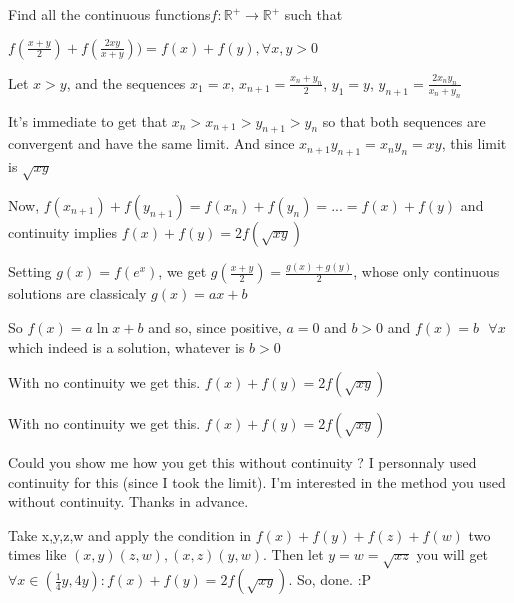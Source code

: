 \begin{solution}
	\begin{tcolorbox}Find all the continuous functions$ f:\mathbb{R}^{+}\rightarrow \mathbb{R}^{+}$ such  that

$f\left ( \frac{x+y}{2} \right )+f\left ( \frac{2xy}{x+y} \right ) )=f(x)+f(y),\forall x,y> 0$\end{tcolorbox}
Let $x>y$, and the sequences $x_1=x$, $x_{n+1}=\frac{x_n+y_n}2$, $y_1=y$, $y_{n+1}=\frac {2x_ny_n}{x_n+y_n}$

It's immediate to get that $x_n>x_{n+1}>y_{n+1}>y_n$ so that both sequences are convergent and have the same limit.
And since $x_{n+1}y_{n+1}=x_ny_n=xy$, this limit is ${\sqrt {xy}}$

Now, $f(x_{n+1})+f(y_{n+1})=f(x_n)+f(y_n)=...=f(x)+f(y)$ and continuity implies $f(x)+f(y)=2f(\sqrt{xy})$

Setting $g(x)=f(e^x)$, we get $g(\frac{x+y}2)=\frac{g(x)+g(y)}2$, whose only continuous solutions are classicaly $g(x)=ax+b$

So $f(x)=a\ln x + b$ and so, since positive, $a=0$ and $b>0$ and $\boxed{f(x)=b\text{  }\forall x}$ which indeed is a solution, whatever is $b>0$
\end{solution}



\begin{solution}
	With no continuity we get this.
$ f(x)+f(y)=2f(\sqrt{xy}) $
\end{solution}



\begin{solution}
	\begin{tcolorbox}With no continuity we get this.
$ f(x)+f(y)=2f(\sqrt{xy}) $\end{tcolorbox}
Could you show me how you get this without continuity ?
I personnaly used continuity for this (since I took the limit). I'm interested in the method you used without continuity.
Thanks in advance.
\end{solution}



\begin{solution}
	Take x,y,z,w and apply the condition in $ f(x)+f(y)+f(z)+f(w) $ two times like $ (x,y)(z,w) ,(x,z)(y,w) $. Then let $ y=w=\sqrt{xz} $ you will get 
$ \forall x\in (\frac{1}{4}y,4y): f(x)+f(y)=2f(\sqrt{xy}) $. So, done. :P
\end{solution}



